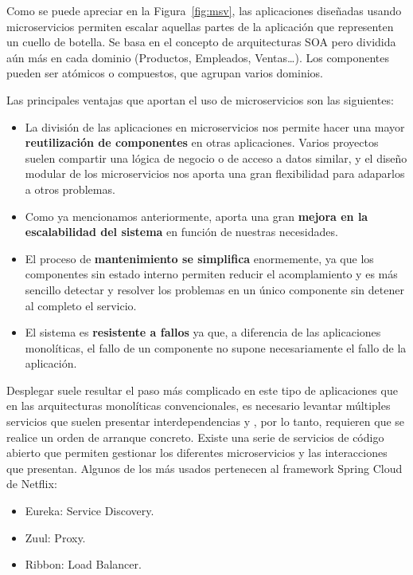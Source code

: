 Como se puede apreciar en la Figura~\ref{fig:msv}, las aplicaciones diseñadas usando microservicios permiten escalar aquellas partes de la aplicación que representen un cuello de botella. Se basa en el concepto de arquitecturas SOA pero dividida aún más en cada dominio (Productos, Empleados, Ventas…). Los componentes pueden ser atómicos o compuestos, que agrupan varios dominios.

Las principales ventajas que aportan el uso de microservicios son las siguientes:
\begin{itemize}
\item La división de las aplicaciones en microservicios nos permite hacer una mayor \textbf{reutilización de componentes} en otras aplicaciones. Varios proyectos suelen compartir una lógica de negocio o de acceso a datos similar, y el diseño modular de los microservicios nos aporta una gran flexibilidad para adaparlos a otros problemas.
\item Como ya mencionamos anteriormente, aporta una gran \textbf{mejora en la escalabilidad del sistema} en función de nuestras necesidades.
\item El proceso de \textbf{mantenimiento se simplifica} enormemente, ya que los componentes sin estado interno permiten reducir el acomplamiento y es más sencillo detectar y resolver los problemas en un único componente sin detener al completo el servicio.
\item El sistema es \textbf{resistente a fallos} ya que, a diferencia de las aplicaciones monolíticas, el fallo de un componente no supone necesariamente el fallo de la aplicación.
\end{itemize}

Desplegar suele resultar el paso más complicado en este tipo de aplicaciones que en las arquitecturas monolíticas convencionales, es necesario levantar múltiples servicios que suelen presentar interdependencias y , por lo tanto, requieren que se realice un orden de arranque concreto. Existe una serie de servicios de código abierto que permiten gestionar los diferentes microservicios y las interacciones que presentan. Algunos de los más usados pertenecen al framework Spring Cloud de Netflix:
\begin{itemize}
\item Eureka: Service Discovery.
\item Zuul: Proxy.
\item Ribbon: Load Balancer.
\end{itemize}



